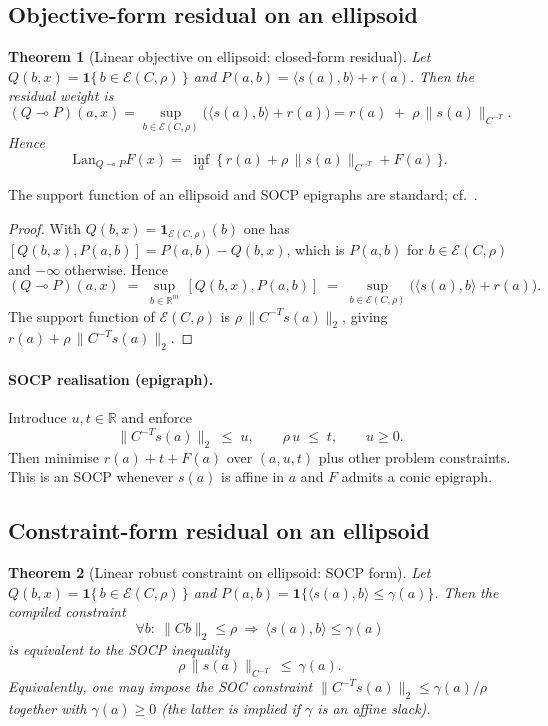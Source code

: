 \documentclass[11pt]{article}
\numberwithin{equation}{section}
\theoremstyle{upright}
\newtheorem{theorem}{Theorem}
\newcommand{\Lan}{\mathrm{Lan}}
\newcommand{\resid}{\multimap}
\begin{document}
\subsection{Objective-form residual on an ellipsoid}

\begin{theorem}[Linear objective on ellipsoid: closed-form residual]\label{thm:ellipsoid-objective}
Let $Q(b,x)=\mathbf 1\{\,b\in \mathcal E(C,\rho)\,\}$ and $P(a,b)=\langle s(a),b\rangle + r(a)$.
Then the residual weight is
\[
(Q\resid P)(a,x)
= \sup_{b\in \mathcal E(C,\rho)}\big(\langle s(a),b\rangle + r(a)\big)
= r(a)\;+\;\rho\,\|s(a)\|_{C^{-T}}.
\]
Hence
\[
\Lan_{Q\resid P}F(x)
=\;\inf_{a}\ \big\{\,r(a)+\rho\,\|s(a)\|_{C^{-T}}+F(a)\,\big\}.
\]
\end{theorem}

The support function of an ellipsoid and SOCP epigraphs are standard; cf.\ \citealp[§3–4]{BoydVandenberghe2004}.

\begin{proof}
With $Q(b,x)=\mathbf 1_{\mathcal E(C,\rho)}(b)$ one has
$[Q(b,x),P(a,b)]=P(a,b)-Q(b,x)$, which is $P(a,b)$ for $b\in\mathcal E(C,\rho)$
and $-\infty$ otherwise. Hence
\[
(Q\resid P)(a,x)\;=\;\sup_{b\in\mathbb R^m}\,[Q(b,x),P(a,b)]
\;=\;\sup_{b\in \mathcal E(C,\rho)} \big(\langle s(a),b\rangle+r(a)\big).
\]
The support function of $\mathcal E(C,\rho)$ is $\rho\,\|C^{-T}s(a)\|_2$, giving
$r(a)+\rho\,\|C^{-T}s(a)\|_2$.
\end{proof}


\paragraph{SOCP realisation (epigraph).}
Introduce $u,t\in\mathbb R$ and enforce
\[
\|C^{-T}s(a)\|_2 \;\le\; u,\qquad \rho\,u \;\le\; t,\qquad u\ge 0.
\]
Then minimise $r(a)+t+F(a)$ over $(a,u,t)$ plus other problem constraints.
This is an SOCP whenever $s(a)$ is affine in $a$ and $F$ admits a conic epigraph.

\subsection{Constraint-form residual on an ellipsoid}

\begin{theorem}[Linear robust constraint on ellipsoid: SOCP form]\label{thm:ellipsoid-constraint}
Let $Q(b,x)=\mathbf 1\{\,b\in \mathcal E(C,\rho)\,\}$ and $P(a,b)=\mathbf 1\{\langle s(a),b\rangle\le \gamma(a)\}$.
Then the compiled constraint
\[
\forall b:\ \|Cb\|_2\le \rho\ \Rightarrow\ \langle s(a),b\rangle \le \gamma(a)
\]
is equivalent to the SOCP inequality
\[
\rho\,\|s(a)\|_{C^{-T}}\ \le\ \gamma(a).
\]
Equivalently, one may impose the SOC constraint $\|C^{-T}s(a)\|_2 \le \gamma(a)/\rho$
together with $\gamma(a)\ge 0$ (the latter is implied if $\gamma$ is an affine slack).
\end{theorem}
\end{document}
